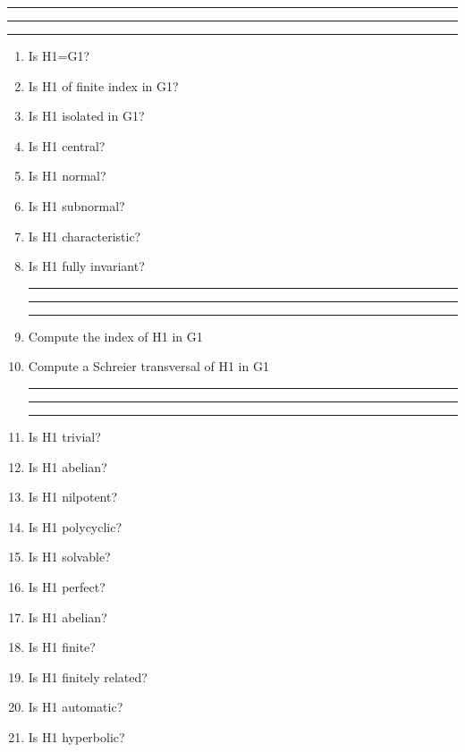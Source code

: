 
\bigskip
\hrule\hrule\hrule

\begin{enumerate}

\item Is H1=G1?

\item Is H1 of finite index in G1?

\item Is H1 isolated in G1?

\item Is H1 central?

\item Is H1 normal?

\item Is H1 subnormal?

\item Is H1 characteristic?

\item Is H1 fully invariant?

\bigskip
\hrule\hrule\hrule

\item Compute the index of H1 in G1

\item Compute a Schreier transversal of H1 in G1

\bigskip
\hrule\hrule\hrule

\item Is H1 trivial?

\item Is H1 abelian?

\item Is H1 nilpotent?

\item Is H1 polycyclic?

\item Is H1 solvable?

\item Is H1 perfect?

\item Is H1 abelian?

\item Is H1 finite?

\item Is H1 finitely related?

\item Is H1 automatic?

\item Is H1 hyperbolic?


\end{enumerate}
